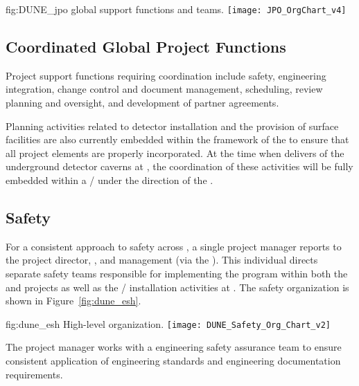 \begin{dunefigure}{fig:DUNE_jpo}
  { global support functions and teams.}
  \texttt{[image: JPO\_OrgChart\_v4]}
\end{dunefigure}


\subsection{Coordinated Global Project Functions}

Project support functions requiring  coordination include
safety, engineering integration, change control and document 
management, scheduling, review planning and oversight, and development 
of partner agreements.  

Planning activities related to detector installation and the provision 
of surface facilities are also currently embedded within the framework 
of the  to ensure that all project elements are properly 
incorporated.  At the time when   delivers 
 of the underground detector caverns at , the 
coordination of these activities will be fully embedded within 
a /  under the direction of the . 


\subsection{Safety}
\label{sec:dune_safety}


For a consistent approach to safety across ,
a single project  manager reports  
to the  project director, , and 
management (via the  ).  This individual
directs separate safety teams responsible for implementing the
  program within both the  
and  projects as well as the /
installation activities at . The safety organization 
is shown in Figure~\ref{fig:dune_esh}.

\begin{dunefigure}{fig:dune_esh}
  {High-level   organization.}
  \texttt{[image: DUNE\_Safety\_Org\_Chart\_v2]}
\end{dunefigure}

The project  manager works with a  
engineering safety assurance team to ensure consistent application of engineering standards and engineering 
documentation requirements. %

